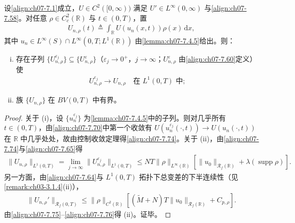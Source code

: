 ﻿\documentclass[../../main.tex]{subfiles}%
\begin{document}
\begin{lemma}\label{lemma:ch07-7.4.6}
设\eqref{align:ch07-7.1}成立，$U\in C^2([0,\infty))$ 满足 $U'\in L^\infty(0,\infty)$ 与\eqref{align:ch07-7.58}。对任意 $\rho\in C^2_c(\mathbb{R})$ 与 $t\in(0,T)$，置
\begin{align}
U_{n,\rho}(t)\triangleq\int_{\mathbb{R}}U(u_n(x,t))\rho(x)\,\mathrm{d}x, \label{align:ch07-7.73}
\end{align}
其中 $u_n\in L^\infty(S)\cap L^\infty(0,T;L^1(\mathbb{R}))$ 由\cref{lemma:ch07-7.4.5}给出。则：
\begin{enumerate}[(i)]
\item 存在子列 $\{U_{n,\rho}^{\varepsilon_j}\}\subseteq\{U_{n,\rho}^\varepsilon\}$（$\varepsilon_j\to0^+$，$j\to\infty$；$U_{n,\rho}^\varepsilon$ 由\eqref{align:ch07-7.60}定义）使
\begin{align}
U_{n,\rho}^{\varepsilon_j}\to U_{n,\rho}\quad\text{在 }L^1(0,T)\text{ 中}; \label{align:ch07-7.74}
\end{align}
\item 族 $\{U_{n,\rho}\}$ 在 $BV(0,T)$ 中有界。
\end{enumerate}
\end{lemma}

\begin{proof}
关于 (i)，设 $\{u_n^{\varepsilon_j}\}$ 为\cref{lemma:ch07-7.4.5}中的子列。则对几乎所有 $t\in(0,T)$，由\eqref{align:ch07-7.70}中第一个收敛有 $U(u_n^{\varepsilon_j}(\cdot,t))\to U(u_n(\cdot,t))$ 在 $\mathbb{R}$ 中几乎处处，故由控制收敛定理得\eqref{align:ch07-7.74}。关于 (ii)，由\eqref{align:ch07-7.74}与\eqref{align:ch07-7.65}得
\begin{align}
\|U_{n,\rho}\|_{L^1(0,T)}=\lim_{j\to\infty}\|U_{n,\rho}^{\varepsilon_j}\|_{L^1(0,T)}
\leqslant NT\|\rho\|_{L^\infty(\mathbb{R})}[\|u_0\|_{\mathscr{R}_f(\mathbb{R})}+\lambda(\operatorname{supp}\rho)]. \label{align:ch07-7.75}
\end{align}
另一方面，由\eqref{align:ch07-7.64}与 $L^1(0,T)$ 拓扑下总变差的下半连续性（见\cref{remark:ch03-3.1.4}(ii)），
\begin{align}
\|U_{n,\rho}'\|_{\mathscr{R}_f(0,T)}\leqslant\|\rho\|_{C^2(\mathbb{R})}[(\widetilde M+N)T\|u_0\|_{\mathscr{R}_f(\mathbb{R})}+C_{p,\rho}]. \label{align:ch07-7.76}
\end{align}
由\eqref{align:ch07-7.75}--\eqref{align:ch07-7.76}得 (ii)。证毕。
\end{proof}
\end{document}
